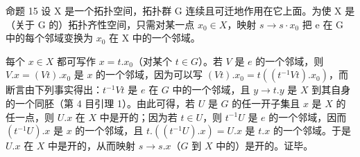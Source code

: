 命题 15 设 X 是一个拓扑空间，拓扑群 G 连续且可迁地作用在它上面。为使 X 是（关于 G 的）拓扑齐性空间，只需对某一点 \(x_{0} \in X\)，映射 \(s \to s \cdot x_{0}\) 把 e 在 G 中的每个邻域变换为 \(x_{0}\) 在 X 中的一个邻域。

每个 \(x \in X\) 都可写作 \(x = t.x_0\)（对某个 \(t \in G\)）。若 \(V\) 是 \(e\) 的一个邻域，则 \(V.x = (Vt).x_0\) 是 \(x\) 的一个邻域，因为可以写 \((Vt).x_0 = t((t^{-1}Vt).x_0)\)，而断言由下列事实得出：\(t^{-1}Vt\) 是 \(e\) 在 \(G\) 中的一个邻域，且 \(y \to t.y\) 是 \(X\) 到其自身的一个同胚（第 4 目引理 1）。由此可得，若 \(U\) 是 \(G\) 的任一开子集且 \(x\) 是 \(X\) 的任一点，则 \(U.x\) 在 \(X\) 中是开的；因为若 \(t \in U\)，则 \(t^{-1}U\) 是 \(e\) 的一个邻域，因而 \((t^{-1}U).x\) 是 \(x\) 的一个邻域，且 \(t.((t^{-1}U).x) = U.x\) 是 \(t.x\) 的一个邻域。于是 \(U.x\) 在 \(X\) 中是开的，从而映射 \(s \to s.x\)（\(G\) 到 \(X\) 中的）是开的。证毕。

